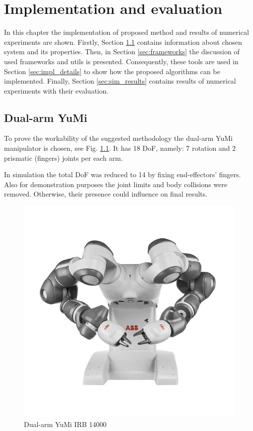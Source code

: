 \chapter{Implementation and evaluation}
\label{chap:impl}

In this chapter the implementation of proposed method and results 
of numerical experiments are shown. Firstly, Section {\ref{sec:dual_arm_yumi}} 
contains information about chosen system and its properties. Then, in Section 
\ref{sec:frameworks} the discussion of used frameworks and utils is presented. 
Consequently, these tools are used in Section \ref{sec:impl_details} to show 
how the proposed algorithms can be implemented. Finally, Section 
\ref{sec:sim_results} contains results of numerical experiments with their 
evaluation.

\section{Dual-arm YuMi}
\label{sec:dual_arm_yumi}

To prove the workability of the suggested methodology the dual-arm YuMi 
manipulator is chosen, see Fig. \ref{fig:dual_arm_yumi}. It has 18 DoF, namely: 
7 rotation and 2 prismatic (fingers) joints per each arm. 

In simulation the total DoF was reduced to 14 by fixing end-effectors' fingers. 
Also for demonstration purposes the joint limits and body collisions were 
removed. Otherwise, their presence could influence on final results.

\begin{figure}[H]
    \centering
    \includegraphics[scale=0.25]{figs/yumi.png}
    \caption{Dual-arm YuMi IRB 14000}
    \label{fig:dual_arm_yumi}
\end{figure}

